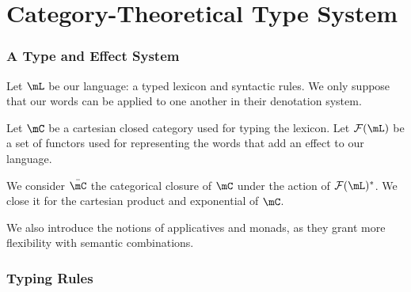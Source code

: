 \documentclass[math, english, info, noamsthm]{beamercours}
\begin{document}
\section{Category-Theoretical Type System}
\begin{frame}
	\frametitle{A Type and Effect System}
	Let $\mL$ be our language: a typed lexicon and syntactic rules.
	We only suppose that our words can be applied to one another in their
	denotation system.

	\pause

	Let $\mC$ be a cartesian closed category used for typing the lexicon.
	Let $\mathcal{F}(\mL)$ be a set of functors used for representing the words
	that add an effect to our language.

	\pause\smallskip

	We consider $\bar{\mC}$ the categorical closure of $\mC$ under the action
	of $\mathcal{F}(\mL)^{*}$.
	We close it for the cartesian product and exponential of $\mC$.

	\pause\smallskip

	We also introduce the notions of applicatives and monads, as they grant more
	flexibility with semantic combinations.
\end{frame}

\begin{frame}[fragile]
	\frametitle{Typing Rules}
\end{frame}
\end{document}
